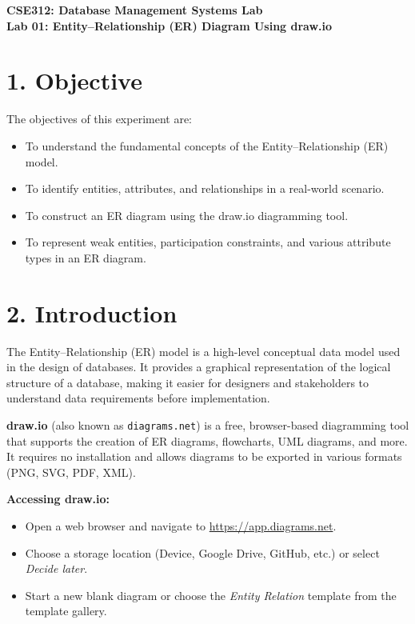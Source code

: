 \documentclass[12pt,a4paper]{article}
\begin{document}
\begin{center}
    {\Large \textbf{CSE312: Database Management Systems Lab}}\\[0.3cm]
    {\large \textbf{Lab 01: Entity–Relationship (ER) Diagram Using draw.io}}
\end{center}

\vspace{0.5cm}

\section*{1. Objective}
The objectives of this experiment are:
\begin{itemize}
    \item To understand the fundamental concepts of the Entity–Relationship (ER) model.
    \item To identify entities, attributes, and relationships in a real-world scenario.
    \item To construct an ER diagram using the draw.io diagramming tool.
    \item To represent weak entities, participation constraints, and various attribute types in an ER diagram.
\end{itemize}

\section*{2. Introduction}
The Entity–Relationship (ER) model is a high-level conceptual data model used in the design of databases.
It provides a graphical representation of the logical structure of a database, making it easier for
designers and stakeholders to understand data requirements before implementation.

\textbf{draw.io} (also known as \texttt{diagrams.net}) is a free, browser-based diagramming tool that
supports the creation of ER diagrams, flowcharts, UML diagrams, and more.
It requires no installation and allows diagrams to be exported in various formats (PNG, SVG, PDF, XML).

\noindent\textbf{Accessing draw.io:}
\begin{itemize}
    \item Open a web browser and navigate to \url{https://app.diagrams.net}.
    \item Choose a storage location (Device, Google Drive, GitHub, etc.) or select \textit{Decide later}.
    \item Start a new blank diagram or choose the \textit{Entity Relation} template from the template gallery.
\end{itemize}
\end{document}
